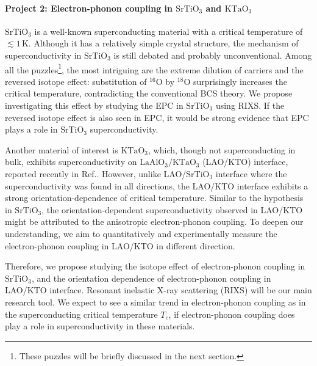 \documentclass[11pt]{article}
\begin{document}
\paragraph{Project 2: Electron-phonon coupling in $\mathrm{SrTiO_{3}}$ and $\mathrm{KTaO_{3}}$} 
$\mathrm{SrTiO_{3}}$ is a well-known superconducting material with a critical temperature of $\lesssim 1\, \mathrm{K}$\cite{schooley_superconductivity_1964,lin_fermi_2013}. 
Although it has a  relatively simple crystal structure, the mechanism of superconductivity in $\mathrm{SrTiO_{3}}$ is still debated and probably unconventional. 
Among all the puzzles\footnote{These puzzles will be briefly discussed in the next section.}, the most intriguing are the extreme dilution of carriers and the reversed isotope effect: substitution of ${}^{16}\mathrm{O}$ by ${}^{18}\mathrm{O}$ surprisingly increases the critical temperature, contradicting the conventional BCS theory\cite{stucky_isotope_2016}. 
We propose investigating this effect by studying the EPC in $\mathrm{SrTiO_{3}}$ using RIXS. If the reversed isotope effect is also seen in EPC, it would be strong evidence that EPC plays a role in $\mathrm{SrTiO_{3}}$ superconductivity.

Another material of interest is $\mathrm{KTaO_{3}}$, which, though not superconducting in bulk, exhibits superconductivity on $\mathrm{LaAlO_{3}/KTaO_{3}}$ (LAO/KTO) interface, reported recently in Ref.\cite{ren_two-dimensional_2022}. 
However, unlike LAO/$\mathrm{SrTiO_{3}}$ interface where the superconductivity was found in all directions, the LAO/KTO interface exhibits a strong orientation-dependence of critical temperature\cite{ren_two-dimensional_2022,chen_two-dimensional_2021}. Similar to the hypothesis in $\mathrm{SrTiO_{3}}$, the orientation-dependent superconductivity observed in LAO/KTO might be attributed to the anisotropic electron-phonon coupling. 
To deepen our understanding, we aim to quantitatively and experimentally measure the electron-phonon coupling in LAO/KTO in different direction. 

Therefore, we propose studying the isotope effect of electron-phonon coupling in $\mathrm{SrTiO_{3}}$, and the orientation dependence of electron-phonon coupling in LAO/KTO interface. 
Resonant inelastic X-ray scattering (RIXS) will be our main research tool. 
We expect to see a similar trend in electron-phonon coupling as in the superconducting critical temperature $T_{c}$, if electron-phonon coupling does play a role in superconductivity in these materials.
\end{document}

